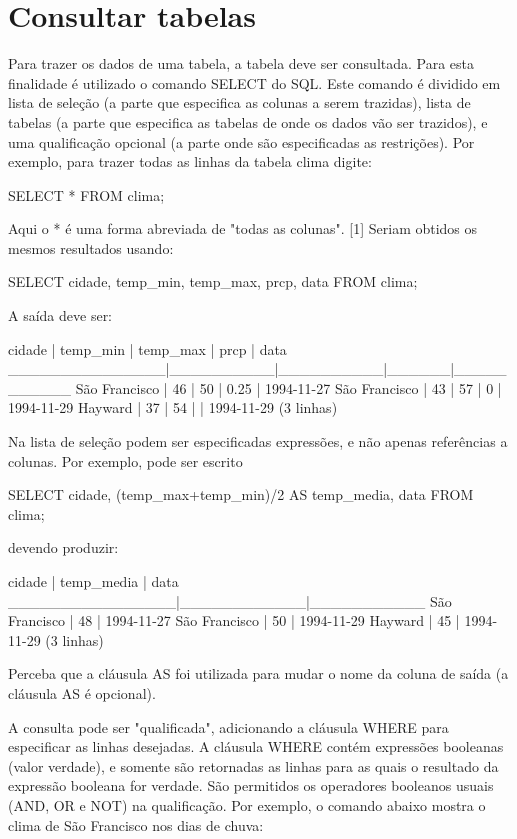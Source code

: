 \section{Consultar tabelas}\setcounter{SteP}{1}
Para trazer os dados de uma tabela, a tabela deve ser consultada. Para esta finalidade 
é utilizado o comando SELECT do SQL. Este comando é dividido em lista de seleção 
(a parte que especifica as colunas a serem trazidas), lista de tabelas (a parte que 
especifica as tabelas de onde os dados vão ser trazidos), e uma qualificação opcional 
(a parte onde são especificadas as restrições). Por exemplo, para trazer todas as linhas da tabela clima digite:

\begin{BoxVerbatim}
SELECT * FROM clima;
\end{BoxVerbatim}
Aqui o * é uma forma abreviada de "todas as colunas". [1] Seriam obtidos os mesmos resultados usando:

\begin{BoxVerbatim}
SELECT cidade, temp_min, temp_max, prcp, data FROM clima;
\end{BoxVerbatim}
A saída deve ser:

\begin{BoxVerbatim}
cidade         | temp_min | temp_max | prcp |    data
_______________|__________|__________|______|___________
São Francisco  |      46  |       50 | 0.25 | 1994-11-27
São Francisco  |      43  |       57 |   0  | 1994-11-29
Hayward        |      37  |       54 |      | 1994-11-29
(3 linhas)
\end{BoxVerbatim}
Na lista de seleção podem ser especificadas expressões, e não apenas referências a colunas. Por exemplo, pode ser escrito

\begin{BoxVerbatim}
SELECT cidade, (temp_max+temp_min)/2 AS temp_media, data FROM clima;
\end{BoxVerbatim}
devendo produzir:
\begin{BoxVerbatim}
	cidade  | temp_media |   data
________________|____________|___________
São Francisco   |        48  | 1994-11-27
São Francisco   |        50  | 1994-11-29
Hayward         |        45  | 1994-11-29
(3 linhas)
\end{BoxVerbatim}
Perceba que a cláusula AS foi utilizada para mudar o nome da coluna de saída (a cláusula AS é opcional).

A consulta pode ser "qualificada", adicionando a cláusula WHERE para especificar as linhas desejadas. A cláusula WHERE contém expressões booleanas (valor verdade), e somente são retornadas as linhas para as quais o resultado da expressão booleana for verdade. São permitidos os operadores booleanos usuais (AND, OR e NOT) na qualificação. Por exemplo, o comando abaixo mostra o clima de São Francisco nos dias de chuva:

